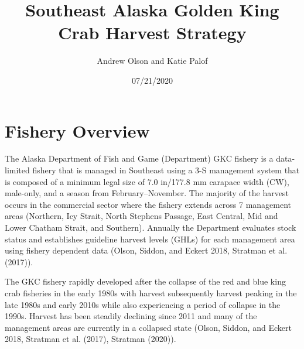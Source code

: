 \documentclass[]{article}
\title{Southeast Alaska Golden King Crab Harvest Strategy}
\author{Andrew Olson and Katie Palof}
\date{07/21/2020}
\begin{document}
\maketitle


\section*{Fishery Overview}\label{fishery-overview}

The Alaska Department of Fish and Game (Department) GKC fishery is a
data-limited fishery that is managed in Southeast using a 3-S management
system that is composed of a minimum legal size of 7.0 in/177.8 mm
carapace width (CW), male-only, and a season from February--November.
The majority of the harvest occurs in the commercial sector where the
fishery extends across 7 management areas (Northern, Icy Strait, North
Stephens Passage, East Central, Mid and Lower Chatham Strait, and
Southern). Annually the Department evaluates stock status and
establishes guideline harvest levels (GHLs) for each management area
using fishery dependent data (Olson, Siddon, and Eckert 2018, Stratman
et al. (2017)).

The GKC fishery rapidly developed after the collapse of the red and blue
king crab fisheries in the early 1980s with harvest subsequently harvest
peaking in the late 1980s and early 2010s while also experiencing a
period of collapse in the 1990s. Harvest has been steadily declining
since 2011 and many of the management areas are currently in a collapsed
state (Olson, Siddon, and Eckert 2018, Stratman et al. (2017), Stratman
(2020)).

\begin{table}[!h]

\caption{\label{tab:unnamed-chunk-1}Golden king crab guideline harvest ranges for Registration Area A [5 AAC 34.115]}
\centering
{}
\end{table}
\end{document}
